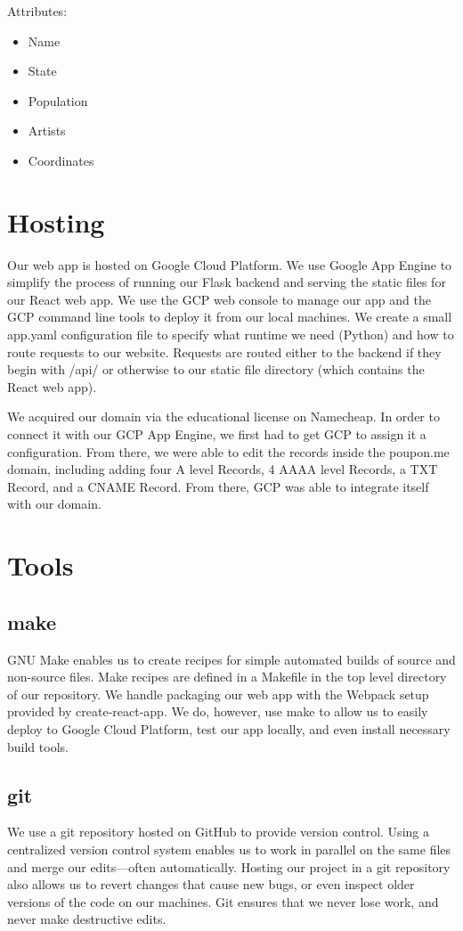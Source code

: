 \documentclass{scrartcl}
\begin{document}
Attributes:
\begin{itemize}
    \item Name
    \item State
    \item Population
    \item Artists
    \item Coordinates
\end{itemize}

\section{Hosting}
Our web app is hosted on Google Cloud Platform. We use Google App Engine to simplify the process of running our Flask backend and serving the static files for our React web app. We use the GCP web console to manage our app and the GCP command line tools to deploy it from our local machines. We create a small app.yaml configuration file to specify what runtime we need (Python) and how to route requests to our website. Requests are routed either to the backend if they begin with /api/ or otherwise to our static file directory (which contains the React web app).

We acquired our domain via the educational license on Namecheap. In order to connect it with our GCP App Engine, we first had to get GCP to assign it a configuration. From there, we were able to edit the records inside the poupon.me domain, including adding four A level Records, 4 AAAA level Records, a TXT Record, and a CNAME Record. From there, GCP was able to integrate itself with our domain.

\section{Tools}

\subsection{make}
GNU Make enables us to create recipes for simple automated builds of source and non-source files. Make recipes are defined in a Makefile in the top level directory of our repository. We handle packaging our web app with the Webpack setup provided by create-react-app. We do, however, use make to allow us to easily deploy to Google Cloud Platform, test our app locally, and even install necessary build tools.

\subsection{git}
We use a git repository hosted on GitHub to provide version control. Using a centralized version control system enables us to work in parallel on the same files and merge our edits—often automatically. Hosting our project in a git repository also allows us to revert changes that cause new bugs, or even inspect older versions of the code on our machines. Git ensures that we never lose work, and never make destructive edits.
\end{document}
